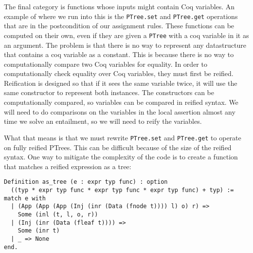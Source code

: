 \documentclass{puthesis}
\begin{document}
The final category is functions whose inputs might contain Coq variables. An example
of where we run into this is the \lstinline|PTree.set| and \lstinline|PTree.get|
operations that are in the postcondition of our assignment rules. These functions
can be computed on their own, even if they are given a \lstinline|PTree| with a
coq variable in it as an argument. The problem is that there is no way to represent
any datastructure that contains a coq variable as a constant. This is because there
is no way to computationally compare two Coq variables for equality. In order to 
computationally check equality over Coq variables, they must first be reified.
Reification is designed so that if it sees the same variable twice, it will use
the same constructor to represent both instances. The constructors can be 
computationally compared, so variables can be compared in reified syntax.
We will need to do comparisons on the variables in the local assertion almost
any time we solve an entailment, so we will need to reify the variables.

What that means is that we must rewrite \lstinline|PTree.set| and \lstinline|PTree.get|
to operate on fully reified PTrees. This can be difficult because of the size 
of the reified syntax. One way to mitigate the complexity of the code is to 
create a function that matches a reified expression as a tree:

\begin{lstlisting}
Definition as_tree (e : expr typ func) : option
  ((typ * expr typ func * expr typ func * expr typ func) + typ) := 
match e with
  | (App (App (App (Inj (inr (Data (fnode t)))) l) o) r) =>
    Some (inl (t, l, o, r))
  | (Inj (inr (Data (fleaf t)))) =>
    Some (inr t)
  | _ => None
end.
\end{lstlisting}
\end{document}
